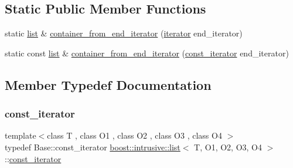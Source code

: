 \subsection*{Static Public Member Functions}
\begin{DoxyCompactItemize}
\item 
static \hyperlink{classboost_1_1intrusive_1_1list}{list} \& \hyperlink{classboost_1_1intrusive_1_1list_a2ae036a74c66652d8552e1d76abdad31}{container\+\_\+from\+\_\+end\+\_\+iterator} (\hyperlink{classboost_1_1intrusive_1_1list_a3b53513ff4e214951fc767223097fb6e}{iterator} end\+\_\+iterator)
\item 
static const \hyperlink{classboost_1_1intrusive_1_1list}{list} \& \hyperlink{classboost_1_1intrusive_1_1list_a411026709c541314c1cf8abf500722ab}{container\+\_\+from\+\_\+end\+\_\+iterator} (\hyperlink{classboost_1_1intrusive_1_1list_a4a837c7b342e3461c2a8ed48df5dd9a3}{const\+\_\+iterator} end\+\_\+iterator)
\end{DoxyCompactItemize}


\subsection{Member Typedef Documentation}
\mbox{\label{classboost_1_1intrusive_1_1list_a4a837c7b342e3461c2a8ed48df5dd9a3}} 
\subsubsection{\texorpdfstring{const\+\_\+iterator}{const\_iterator}}
{\footnotesize\ttfamily template$<$class T , class O1 , class O2 , class O3 , class O4 $>$ \\
typedef Base\+::const\+\_\+iterator \hyperlink{classboost_1_1intrusive_1_1list}{boost\+::intrusive\+::list}$<$ T, O1, O2, O3, O4 $>$\+::\hyperlink{classboost_1_1intrusive_1_1list_a4a837c7b342e3461c2a8ed48df5dd9a3}{const\+\_\+iterator}}

\mbox{\label{classboost_1_1intrusive_1_1list_a3b53513ff4e214951fc767223097fb6e}} 
